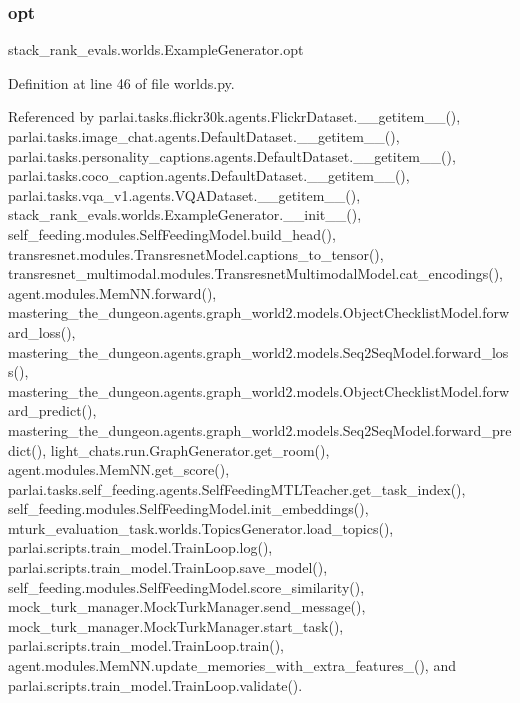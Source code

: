 \mbox{\label{classstack__rank__evals_1_1worlds_1_1ExampleGenerator_ace0d63240bf6384a7ba7552f813ce600}} 
\subsubsection{\texorpdfstring{opt}{opt}}
{\footnotesize\ttfamily stack\+\_\+rank\+\_\+evals.\+worlds.\+Example\+Generator.\+opt}



Definition at line 46 of file worlds.\+py.



Referenced by parlai.\+tasks.\+flickr30k.\+agents.\+Flickr\+Dataset.\+\_\+\+\_\+getitem\+\_\+\+\_\+(), parlai.\+tasks.\+image\+\_\+chat.\+agents.\+Default\+Dataset.\+\_\+\+\_\+getitem\+\_\+\+\_\+(), parlai.\+tasks.\+personality\+\_\+captions.\+agents.\+Default\+Dataset.\+\_\+\+\_\+getitem\+\_\+\+\_\+(), parlai.\+tasks.\+coco\+\_\+caption.\+agents.\+Default\+Dataset.\+\_\+\+\_\+getitem\+\_\+\+\_\+(), parlai.\+tasks.\+vqa\+\_\+v1.\+agents.\+V\+Q\+A\+Dataset.\+\_\+\+\_\+getitem\+\_\+\+\_\+(), stack\+\_\+rank\+\_\+evals.\+worlds.\+Example\+Generator.\+\_\+\+\_\+init\+\_\+\+\_\+(), self\+\_\+feeding.\+modules.\+Self\+Feeding\+Model.\+build\+\_\+head(), transresnet.\+modules.\+Transresnet\+Model.\+captions\+\_\+to\+\_\+tensor(), transresnet\+\_\+multimodal.\+modules.\+Transresnet\+Multimodal\+Model.\+cat\+\_\+encodings(), agent.\+modules.\+Mem\+N\+N.\+forward(), mastering\+\_\+the\+\_\+dungeon.\+agents.\+graph\+\_\+world2.\+models.\+Object\+Checklist\+Model.\+forward\+\_\+loss(), mastering\+\_\+the\+\_\+dungeon.\+agents.\+graph\+\_\+world2.\+models.\+Seq2\+Seq\+Model.\+forward\+\_\+loss(), mastering\+\_\+the\+\_\+dungeon.\+agents.\+graph\+\_\+world2.\+models.\+Object\+Checklist\+Model.\+forward\+\_\+predict(), mastering\+\_\+the\+\_\+dungeon.\+agents.\+graph\+\_\+world2.\+models.\+Seq2\+Seq\+Model.\+forward\+\_\+predict(), light\+\_\+chats.\+run.\+Graph\+Generator.\+get\+\_\+room(), agent.\+modules.\+Mem\+N\+N.\+get\+\_\+score(), parlai.\+tasks.\+self\+\_\+feeding.\+agents.\+Self\+Feeding\+M\+T\+L\+Teacher.\+get\+\_\+task\+\_\+index(), self\+\_\+feeding.\+modules.\+Self\+Feeding\+Model.\+init\+\_\+embeddings(), mturk\+\_\+evaluation\+\_\+task.\+worlds.\+Topics\+Generator.\+load\+\_\+topics(), parlai.\+scripts.\+train\+\_\+model.\+Train\+Loop.\+log(), parlai.\+scripts.\+train\+\_\+model.\+Train\+Loop.\+save\+\_\+model(), self\+\_\+feeding.\+modules.\+Self\+Feeding\+Model.\+score\+\_\+similarity(), mock\+\_\+turk\+\_\+manager.\+Mock\+Turk\+Manager.\+send\+\_\+message(), mock\+\_\+turk\+\_\+manager.\+Mock\+Turk\+Manager.\+start\+\_\+task(), parlai.\+scripts.\+train\+\_\+model.\+Train\+Loop.\+train(), agent.\+modules.\+Mem\+N\+N.\+update\+\_\+memories\+\_\+with\+\_\+extra\+\_\+features\+\_\+(), and parlai.\+scripts.\+train\+\_\+model.\+Train\+Loop.\+validate().



